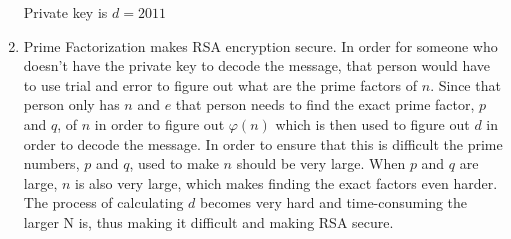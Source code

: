 \documentclass[11pt]{article}
\begin{document}
\begin{enumerate}
Private key is $d = 2011$


\item
Prime Factorization makes RSA encryption secure. In order for someone who doesn't have the private key to decode the message, that person would  have to use trial and error to figure out what are the prime factors of $n$. Since that person only has $n$ and $e$ that person needs to find the exact prime factor, $p$ and $q$, of $n$ in order to figure out $\varphi (n)$ which is then used to figure out $d$ in order to decode the message. In order to ensure that this is difficult the prime numbers, $p$ and $q$, used to make $n$ should be very large. When $p$ and $q$ are large, $n$ is also very large, which makes finding the exact factors even harder. The process of calculating $d$ becomes very hard and time-consuming the larger N is, thus making it difficult and making RSA secure. 


\end{enumerate}
\end{document}
